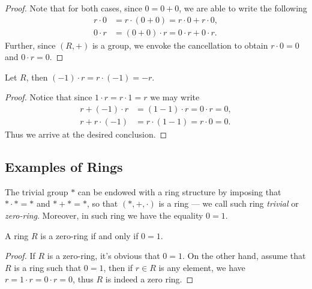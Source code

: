 %
\begin{proof}
Note that for both cases, since \(0 = 0 + 0\), we are able to write the
following
\begin{align*}
  r \cdot 0 &= r \cdot (0 + 0) = r \cdot 0 + r \cdot 0, \\
  0 \cdot r &= (0 + 0) \cdot r = 0 \cdot r + 0 \cdot r.
\end{align*}
Further, since \((R, +)\) is a group, we envoke the cancellation to obtain
\(r \cdot 0 = 0\) and \(0 \cdot r = 0\).
\end{proof}
%

%
\begin{corollary}
\label{cor:ring-additive-inverse}
Let \(R\), then \((-1) \cdot r = r \cdot (-1) = -r\).
\end{corollary}
%

%
\begin{proof}
Notice that since \(1 \cdot r = r \cdot 1 = r\) we may write
\begin{align*}
  r + (-1) \cdot r &= (1 - 1) \cdot r = 0 \cdot r = 0, \\
  r + r \cdot (-1) &= r \cdot (1 - 1) = r \cdot 0 = 0.
\end{align*}
Thus we arrive at the desired conclusion.
\end{proof}
%

\subsection{Examples of Rings}

%
\begin{example}
\label{exp:trivial-ring}
The trivial group \(*\) can be endowed with a ring structure by imposing that
\(* \cdot * = *\) and \(* + * = *\), so that \((*, +, \cdot)\) is a ring --- we
call such ring \emph{trivial} or \emph{zero-ring}. Moreover, in such ring we
have the equality \(0 = 1\).
\end{example}
%

%
\begin{corollary}
\label{cor:zero-ring-condition}
A ring \(R\) is a zero-ring if and only if \(0 = 1\).
\end{corollary}
%

%
\begin{proof}
If \(R\) is a zero-ring, it's obvious that \(0 = 1\). On the other hand, assume
that \(R\) is a ring such that \(0 = 1\), then if \(r \in R\) is any element, we
have \(r = 1 \cdot r = 0 \cdot r = 0\), thus \(R\) is indeed a zero ring.
\end{proof}
%

